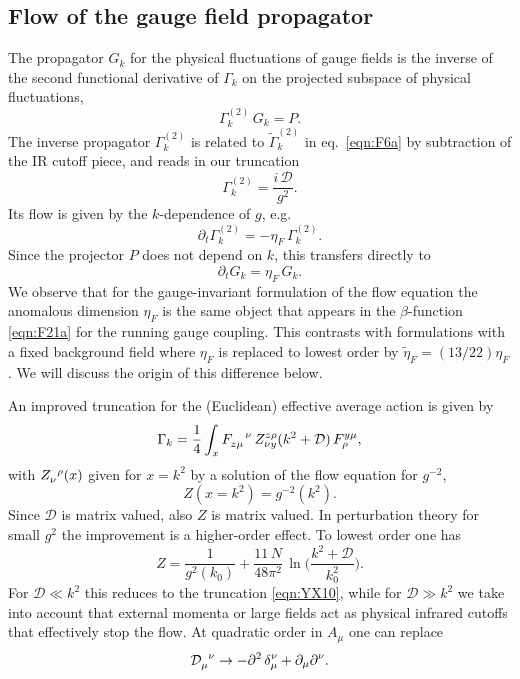 \documentclass[twocolumn,aps,prd,amsmath,amssymb,preprintnumbers,longbibliography]{revtex4-1}
\numberwithin{equation}{section}
\begin{document}
\subsection{Flow of the gauge field propagator}

The propagator $G_k$ for the physical fluctuations of gauge fields is the inverse of the second functional derivative of $\Gamma_k$ on the projected subspace of physical fluctuations,
\begin{equation}
	\Gamma_k^{(2)} \, G_k
	= P.
\end{equation}
The inverse propagator $\Gamma_k^{(2)}$ is related to $\tilde\Gamma_k^{(2)}$ in eq.~\eqref{eqn:F6a} by subtraction of the IR cutoff piece, and reads in our truncation
\begin{equation}\label{eqn:F1}
	\Gamma_k^{(2)}
	= \frac{i \, \mathcal{D}}{g^2}.
\end{equation}
Its flow is given by the $k$-dependence of $g$, e.g.
\begin{equation}\label{eqn:F2}
	\partial_t \Gamma_k^{(2)}
	= -\eta_F \, \Gamma_k^{(2)}.
\end{equation}
Since the projector $P$ does not depend on $k$, this transfers directly to
\begin{equation}\label{eqn:F3}
	\partial_t G_k
	= \eta_F \, G_k.
\end{equation}
We observe that for the gauge-invariant formulation of the flow equation the anomalous dimension $\eta_F$ is the same object that appears in the $\beta$-function \eqref{eqn:F21a} for the running gauge coupling. This contrasts with formulations with a fixed background field where $\eta_F$ is replaced to lowest order by $\tilde\eta_F = (13/22) \eta_F$. We will discuss the origin of this difference below.

An improved truncation for the (Euclidean) effective average action is given by
\begin{equation}\label{eqn:F4}
	\Gamma_k
	= \frac{1}{4} \int_x \tensor{F}{_z_\mu^\nu} \, Z_{\nu y}^{z \rho}(k^2 + \mathcal{D}) \, F_\rho^{y \mu},
\end{equation}
with $\tensor{Z}{_\nu^\rho}(x)$ given for $x = k^2$ by a solution of the flow equation for $g^{-2}$,
\begin{equation}\label{eqn:F5}
	Z(x = k^2)
	= g^{-2}(k^2).
\end{equation}
Since $\mathcal{D}$ is matrix valued, also $Z$ is matrix valued. In perturbation theory for small $g^2$ the improvement is a higher-order effect. To lowest order one has
\begin{equation}\label{eqn:F6}
	Z
	= \frac{1}{g^2(k_0)} + \frac{11 \, N}{48 \pi^2} \, \ln\biggl(\frac{k^2 + \mathcal{D}}{k_0^2}\biggr).
\end{equation}
For $\mathcal{D} \ll k^2$ this reduces to the truncation \eqref{eqn:YX10}, while for $\mathcal{D} \gg k^2$ we take into account that external momenta or large fields act as physical infrared cutoffs that effectively stop the flow. At quadratic order in $A_\mu$ one can replace
\begin{equation}
	\tensor{\mathcal{D}}{_\mu^\nu}
	\to -\partial^2 \, \delta_\mu^\nu + \partial_\mu \partial^\nu.
\end{equation}
\end{document}
